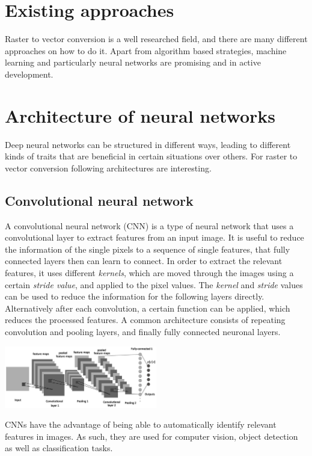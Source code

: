 \documentclass[12pt, a4paper, titlepage]{report}
\begin{document}
\section{Existing approaches}

Raster to vector conversion is a well researched field, and there are many different approaches on how to do it. Apart from algorithm based strategies, machine learning and particularly neural networks are promising and in active development. 

\section{Architecture of neural networks}

Deep neural networks can be structured in different ways, leading to different kinds of traits that are beneficial in certain situations over others. For raster to vector conversion following architectures are interesting.

\subsection{Convolutional neural network}

A convolutional neural network (CNN) is a type of neural network that uses a convolutional layer to extract features from an input image. It is useful to reduce the information of the single pixels to a sequence of single features, that fully connected layers then can learn to connect. In order to extract the relevant features, it uses different \emph{kernels}, which are moved through the images using a certain \emph{stride value}, and applied to the pixel values. The \emph{kernel} and \emph{stride} values can be used to reduce the information for the following layers directly. Alternatively after each convolution, a certain function can be applied, which reduces the processed features. A common architecture consists of repeating convolution and pooling layers, and finally fully connected neuronal layers.

{
	\centering
	\includegraphics[width=0.5\textwidth]{../rc/images/cnn_architecture.png}
	\label{fig:cnn_architecture}
}


CNNs have the advantage of being able to automatically identify relevant features in images. As such, they are used for computer vision, object detection as well as classification tasks.
\end{document}
